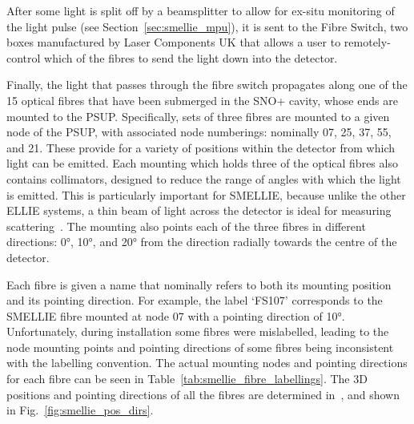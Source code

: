 After some light is split off by a beamsplitter to allow for ex-situ monitoring of the light pulse (see Section~\ref{sec:smellie_mpu}), it is sent to the Fibre Switch, two boxes manufactured by Laser Components UK that allows a user to remotely-control which of the fibres to send the light down into the detector.

Finally, the light that passes through the fibre switch propagates along one of the 15 optical fibres that have been submerged in the SNO+ cavity, whose ends are mounted to the PSUP. Specifically, sets of three fibres are mounted to a given node of the PSUP, with associated node numberings: nominally 07, 25, 37, 55, and 21. These provide for a variety of positions within the detector from which light can be emitted. Each mounting which holds three of the optical fibres also contains collimators, designed to reduce the range of angles with which the light is emitted. This is particularly important for SMELLIE, because unlike the other ELLIE systems, a thin beam of light across the detector is ideal for measuring scattering~\cite{majumdarMeasurementOpticalScattering2015}. %
The mounting also points each of the three fibres in different directions: \ang{0}, \ang{10}, and \ang{20} from the direction radially towards the centre of the detector.

Each fibre is given a name that nominally refers to both its mounting position and its pointing direction. For example, the label `FS107' corresponds to the SMELLIE fibre mounted at node 07 with a pointing direction of \ang{10}. Unfortunately, during installation some fibres were mislabelled, leading to the node mounting points and pointing directions of some fibres being inconsistent with the labelling convention. The actual mounting nodes and pointing directions for each fibre can be seen in Table~\ref{tab:smellie_fibre_labellings}.
The 3D positions and pointing directions of all the fibres are determined in~\cite{langrockMeasurementRayleighScattering2016}, and shown in Fig.~\ref{fig:smellie_pos_dirs}.

